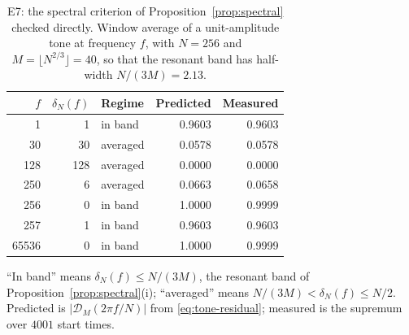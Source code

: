 \begin{table}[t]
\centering
\caption{E7: the spectral criterion of Proposition~\ref{prop:spectral} checked
directly. Window average of a unit-amplitude tone at frequency $f$, with $N=256$ and
$M=\lfloor N^{2/3}\rfloor=40$, so that the resonant band has half-width
$N/(3M)=2.13$.}
\label{tab:spectral}
\small
\setlength{\tabcolsep}{9pt}
\renewcommand{\arraystretch}{1.15}
\begin{tabular}{@{}r r l r r@{}}
\toprule
$f$ & $\delta_{N}(f)$ & Regime & Predicted & Measured \\
\midrule
1     & 1   & in band  & 0.9603 & 0.9603 \\
30    & 30  & averaged & 0.0578 & 0.0578 \\
128   & 128 & averaged & 0.0000 & 0.0000 \\
250   & 6   & averaged & 0.0663 & 0.0658 \\
256   & 0   & in band  & 1.0000 & 0.9999 \\
257   & 1   & in band  & 0.9603 & 0.9603 \\
65536 & 0   & in band  & 1.0000 & 0.9999 \\
\bottomrule
\end{tabular}

\smallskip
{\footnotesize ``In band'' means $\delta_{N}(f)\le N/(3M)$, the resonant band of
Proposition~\ref{prop:spectral}(i); ``averaged'' means $N/(3M)<\delta_{N}(f)\le N/2$.
Predicted is $|\mathcal{D}_{M}(2\pi f/N)|$ from \eqref{eq:tone-residual}; measured is
the supremum over $4001$ start times.}
\end{table}
